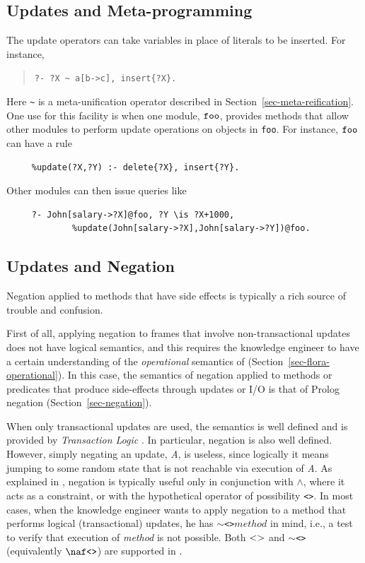 \documentclass[11pt]{article}
\newcommand{\ERGO}{\mbox{\smaller{\ensuremath{\cal{E}}\smaller{{\sc{RGO}}}}}\xspace}
\newcommand{\FLSYSTEM}{\ERGO}
\newcommand{\bs}{\textbackslash}
\newcommand{\RULELOGNAF}{{\texttt{{\bs}naf}}\xspace}
\begin{document}
\subsection{Updates and Meta-programming}

The update operators can take variables in place of literals to be
inserted.  For instance,
\begin{quote}
 {\tt ?-  ?X \verb|~| a[b->c], insert\{?X\}.}
\end{quote}
  Here \verb|~| is a meta-unification operator described in
  Section~\ref{sec-meta-reification}.
One use for this facility is when one module, $\tt foo$, provides methods that
allow other modules to perform update operations on objects in {\tt foo}.
For instance, $\tt foo$ can have a rule
\begin{verbatim}
     %update(?X,?Y) :- delete{?X}, insert{?Y}.
\end{verbatim}
Other modules can then issue queries like
\begin{verbatim}
     ?- John[salary->?X]@foo, ?Y \is ?X+1000,
             %update(John[salary->?X],John[salary->?Y])@foo.  
\end{verbatim}

\subsection{Updates and Negation}

Negation applied to methods that have side effects is typically a rich source
of trouble and confusion.

First of all, applying negation to frames that involve
non-transactional updates does not have logical semantics, and this
requires the
knowledge engineer to have a certain understanding of the \emph{operational} semantics of
\FLSYSTEM (Section~\ref{sec-flora-operational}).
In this case, the semantics of negation applied to methods or predicates that produce
side-effects through updates  or I/O is that of Prolog negation
(Section~\ref{sec-negation}).

When only transactional updates are used, the semantics is well defined and
is provided by \emph{Transaction Logic}
\cite{trans-chapter-98,trans-tcs94}. In particular, negation is also well
defined. However, simply negating an update, \emph{A}, is useless,
since logically it means jumping to some random state that is not
reachable via execution of \emph{A}.  As explained in
\cite{trans-chapter-98,trans-tcs94}, negation is typically useful only in conjunction
with $\wedge$, where it acts as a constraint, or with the hypothetical
operator of possibility \texttt{<>}.  In most cases, when the knowledge
engineer
wants to apply negation to a method that performs logical (transactional)
updates, he has \texttt{$\sim$<>}$method$  in mind, i.e., a test to
verify that execution of \emph{method}  is not possible.
Both $\tt<>$ and \texttt{$\sim$<>} (equivalently $\tt\RULELOGNAF \texttt{<>}$) are supported in \FLSYSTEM.
\end{document}

